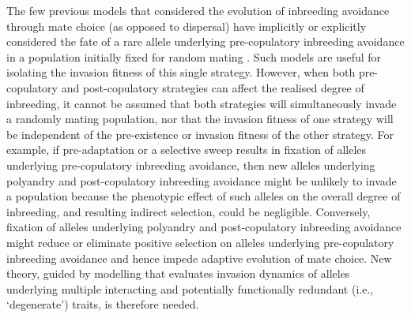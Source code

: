 \documentclass[12pt]{article}
\begin{document}
The few previous models that considered the evolution of inbreeding avoidance through mate choice (as opposed to dispersal) have implicitly or explicitly considered the fate of a rare allele underlying pre-copulatory inbreeding avoidance in a population initially fixed for random mating \cite[e.g.,][]{Parker1979, Parker2006, Duthie, Duthie2016a}. Such models are useful for isolating the invasion fitness of this single strategy. However, when both pre-copulatory and post-copulatory strategies can affect the realised degree of inbreeding, it cannot be assumed that both strategies will simultaneously invade a randomly mating population, nor that the invasion fitness of one strategy will be independent of the pre-existence or invasion fitness of the other strategy. For example, if pre-adaptation or a selective sweep results in fixation of alleles underlying pre-copulatory inbreeding avoidance, then new alleles underlying polyandry and post-copulatory inbreeding avoidance might be unlikely to invade a population because the phenotypic effect of such alleles on the overall degree of inbreeding, and resulting indirect selection, could be negligible. Conversely, fixation of alleles underlying polyandry and post-copulatory inbreeding avoidance might reduce or eliminate positive selection on alleles underlying pre-copulatory inbreeding avoidance and hence impede adaptive evolution of mate choice. New theory, guided by modelling that evaluates invasion dynamics of alleles underlying multiple interacting and potentially functionally redundant (i.e., `degenerate') traits, is therefore needed.
\end{document}
